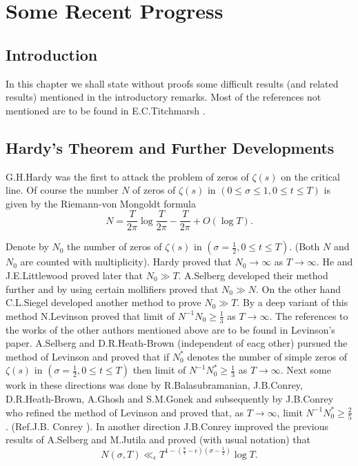 
\chapter{Some Recent Progress}\label{c6}

\section{Introduction}\label{c6:sec6.1}\pageoriginale

In this chapter we shall state without proofs some difficult results (and related results) mentioned in the introductory remarks. Most of the references not mentioned are to be found in E.C.\@ Titchmarsh \cite{Titchmarsh1}.

\section{Hardy's Theorem and Further Developments}\label{c6:sec6.2}

G.H.\@ Hardy was the first to attack the problem of zeros of $\zeta(s)$ on the critical line. Of course the number $N$ of zeros of $\zeta(s)$ in $(0\leq \sigma\leq 1,0\leq t\leq T)$ is given by the Riemann-von Mongoldt formula
$$
N=\frac{T}{2\pi}\log \frac{T}{2\pi}-\frac{T}{2\pi}+O(\log T).
$$

Denote by $N_{0}$ the number of zeros of $\zeta(s)$ in
$(\sigma=\frac{1}{2}, 0\leq t\leq T)$. (Both $N$ and $N_{0}$ are
counted with multiplicity). Hardy proved that $N_{0}\to \infty$ as
$T\to \infty$. He and J.E.\@ Littlewood proved later that $N_{0}\gg
T$. A.\@ Selberg developed their method further and by using certain
mollifiers proved that $N_{0}\gg N$. On the other hand C.L.\@ Siegel
developed another method to prove $N_{0}\gg T$. By a deep variant of
this method N.\@ Levinson \cite{Levinson2} proved that limit of
$N^{-1}N_{0}\geq \frac{1}{3}$ as $T\to\infty$. The references to the
works of the other authors mentioned above are to be found in
Levinson's paper. A.\@ Selberg and D.R.\@ Heath-Brown (independent of
eacg other) pursued the method of Levinson and proved that if
$N^{*}_{0}$ denotes the number of simple zeros of $\zeta(s)$ in
$(\sigma=\frac{1}{2},0\leq t\leq T)$ then limit of
$N^{-1}N^{*}_{0}\geq \frac{1}{3}$ as $T\to \infty$. Next some work in
these directions was done by R.\@ Balasubramanian, J.B.\@ Conrey,
D.R.\@ Heath-Brown, A.\@ Ghosh and S.M.\@ Gonek and subsequently by
J.B.\@ Conrey who  refined the method of Levinson and proved that, as
$T\to \infty$, limit $N^{-1}N^{*}_{0}\geq \frac{2}{5}$. (Ref.\@ J.B.\@
Conrey \cite{Conrey1}). In another direction J.B.\@ Conrey improved the
previous results of A.\@ Selberg and M.\@ Jutila and proved (with
usual notation) that
$$
N(\sigma,T)\ll_{\epsilon}T^{1-(\frac{8}{7}-\epsilon)(\sigma-\frac{1}{2})}\log
T. 
$$


